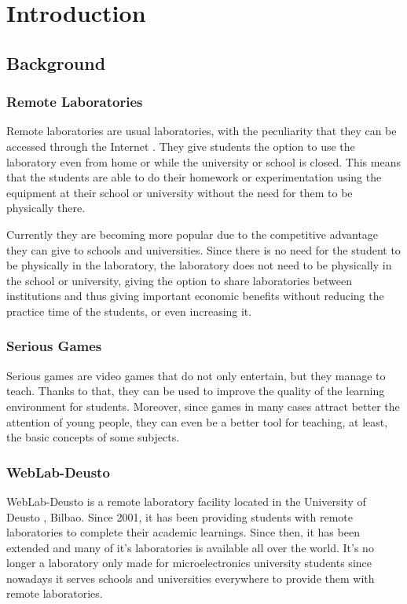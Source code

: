 \chapter{Introduction}

\section{Background}


\subsection{Remote Laboratories}

Remote laboratories are usual laboratories, with the peculiarity that they can be accessed through
the Internet \cite{remote_labs}. They give students the option to use the laboratory even from home
or while the university or school is closed. This means that the students are able to do their
homework or experimentation using the equipment at their school or university without the need for
them to be physically there.

Currently they are becoming more popular due to the competitive advantage they can give to schools
and universities. Since there is no need for the student to be physically in the laboratory, the
laboratory does not need to be physically in the school or university, giving the option to share
laboratories between institutions and thus giving important economic benefits without reducing
the practice time of the students, or even increasing it.

\subsection{Serious Games}

Serious games are video games that do not only entertain, but they manage to teach. Thanks to that,
they can be used to improve the quality of the learning environment for students. Moreover, since
games in many cases attract better the attention of young people, they can even be a better tool for
teaching, at least, the basic concepts of some subjects.

\subsection{WebLab-Deusto}

WebLab-Deusto is a remote laboratory facility located in the University of Deusto \cite{weblab},
Bilbao. Since 2001, it has been providing students with remote laboratories to complete their
academic learnings. Since then, it has been extended and many of it's laboratories is available
all over the world. It's no longer a laboratory only made for microelectronics university students
since nowadays it serves schools and universities everywhere to provide them with remote
laboratories.

